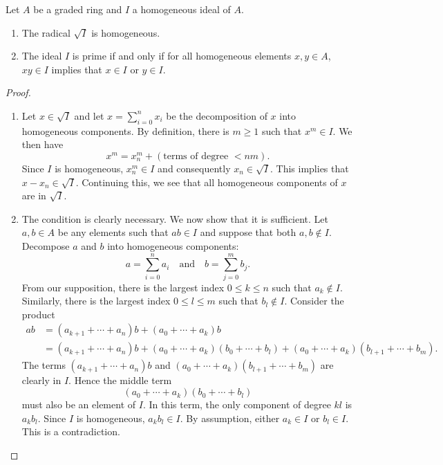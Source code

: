\begin{lemma}\label{chap6:lemma-on-homogeneous-ideal}
	Let $A$ be a graded ring and $I$ a homogeneous ideal of $A$. 
	\begin{enumerate}
		\item The radical $\sqrt{I}$ is homogeneous.
		
		\item The ideal $I$ is prime if and only if for all homogeneous elements $x, y \in A$, $xy \in I$ implies that $x \in I$ or $y \in I$.
	\end{enumerate}
\end{lemma}
\begin{proof}
	\begin{enumerate}[wide]
	\item Let $x \in \sqrt{I}$ and let $x = \sum_{i = 0}^n x_i$ be the decomposition of $x$ into homogeneous components. By definition, there is $m \geq 1$ such that $x^m \in I$. We then have
	\begin{equation*}
		x^m = x_n^m + (\text{terms of degree $< nm$}).
	\end{equation*}
	Since $I$ is homogeneous, $x_n^m \in I$ and consequently $x_n \in \sqrt{I}$. This implies that $x - x_n \in \sqrt{I}$. Continuing this, we see that all homogeneous components of $x$ are in $\sqrt{I}$.
	
	\item The condition is clearly necessary. We now show that it is sufficient. Let $a, b \in A$ be any elements such that $ab \in I$ and suppose that both $a, b \notin I$. Decompose $a$ and $b$ into homogeneous components:
	\begin{equation*}
		a = \sum_{i = 0}^n a_i \quad\text{and}\quad b = \sum_{j = 0}^m b_j.
	\end{equation*}
	From our supposition, there is the largest index $0 \leq k \leq n$ such that $a_k \notin I$. Similarly, there is the largest index $0 \leq l \leq m$ such that $b_l \notin I$. Consider the product 
	\begin{align*}
		ab & = (a_{k + 1} + \dotsb + a_n)b + (a_0 + \dotsb + a_k)b\\
		& = (a_{k + 1} + \dotsb + a_n)b + (a_0 + \dotsb + a_k)(b_0 + \dotsb + b_l) + (a_0 + \dotsb + a_k)(b_{l + 1} + \dotsb + b_m).
	\end{align*}
	The terms $(a_{k + 1} + \dotsb + a_n)b$ and $(a_0 + \dotsb + a_k)(b_{l + 1} + \dotsb + b_m)$ are clearly in $I$. Hence the middle term 
	\begin{equation*}
		(a_0 + \dotsb + a_k)(b_0 + \dotsb + b_l)
	\end{equation*}
	must also be an element of $I$. In this term, the only component of degree $kl$ is $a_k b_l$. Since $I$ is homogeneous, $a_k b_l \in I$. By assumption, either $a_k \in I$ or $b_l \in I$. This is a contradiction. \qedhere
	\end{enumerate}
\end{proof}

